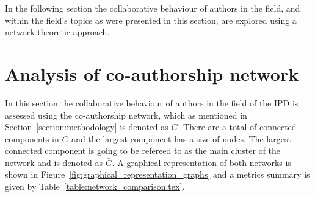 \documentclass{article}
\theoremstyle{definition}
\newcommand{\connectedcomponents}{}
\newcommand{\largestcc}{}
\begin{document}
In the following section the collaborative behaviour of authors in the field,
and within the field's topics as were presented in this section, are explored
using a network theoretic approach.

\section{Analysis of co-authorship network}\label{section:co_authorship}

In this section the collaborative behaviour of authors in the field of the IPD
is assessed using the co-authorship network, which as mentioned in
Section~\ref{section:methodology} is denoted as \(G\). There are a total of
\connectedcomponents connected components in \(G\) and the largest component has
a size of \largestcc nodes. The largest connected component is going to be
refereed to as the main cluster of the network and is denoted as \(\bar{G}\). A
graphical representation of both networks is shown in
Figure~\ref{fig:graphical_representation_graphs} and a metrics summary is given by
Table~\ref{table:network_comparison.tex}.
\end{document}
